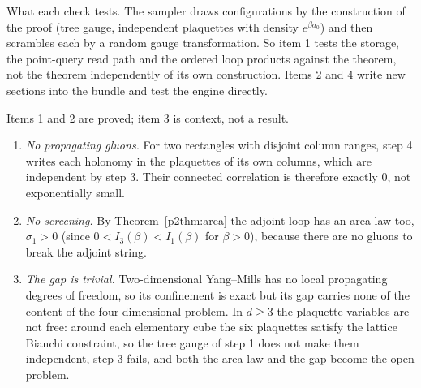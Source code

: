 \noindent What each check tests. The sampler draws configurations by the construction of the proof (tree gauge,
independent plaquettes with density $e^{\beta a_0}$) and then scrambles each by a random gauge transformation. So item 1
tests the storage, the point-query read path and the ordered loop products against the theorem, not the theorem
independently of its own construction. Items 2 and 4 write new sections into the bundle and test the engine directly.

\begin{remark}\label{p2rem:limit}
 Items 1 and 2 are proved; item 3 is context, not a result.
\begin{enumerate}[nosep,leftmargin=1.4em]
\item \emph{No propagating gluons.} For two rectangles with disjoint column ranges, step 4 writes each holonomy in the
plaquettes of its own columns, which are independent by step 3. Their connected correlation is therefore exactly $0$,
not exponentially small.
\item \emph{No screening.} By Theorem~\ref{p2thm:area} the adjoint loop has an area law too, $\sigma_1>0$ (since
$0<I_3(\beta)<I_1(\beta)$ for $\beta>0$), because there
are no gluons to break the adjoint string.
\item \emph{The gap is trivial.} Two-dimensional Yang--Mills has no local propagating degrees of freedom, so its
confinement is exact but its gap carries none of the content of the four-dimensional problem. In $d\ge3$ the plaquette
variables are not free: around each elementary cube the six plaquettes satisfy the lattice Bianchi constraint, so the
tree gauge of step 1 does not make them independent, step 3 fails, and both the area law and the gap become the open
problem.
\end{enumerate}
\end{remark}
